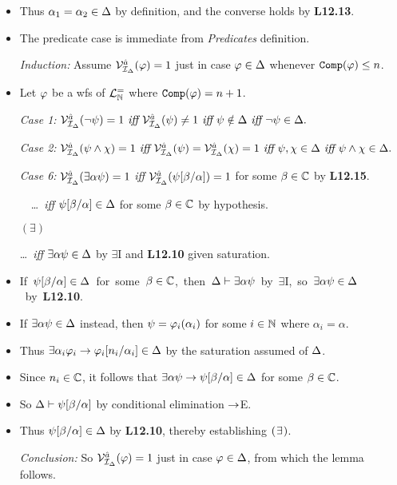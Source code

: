 \documentclass[a4paper, 11pt]{article} %
\begin{document}
\begin{itemize}
    \item Thus $\alpha_1=\alpha_2\in\Delta$ by definition, and the converse holds by \textbf{L12.13}.
    \item The predicate case is immediate from \textit{Predicates} definition.
  \item[\it Induction:] Assume $\mathcal{V}_{\mathcal{I}_{\Delta}}^{\hat{a}}(\varphi)=1$ just in case $\varphi\in\Delta$ whenever $\texttt{Comp}(\varphi)\leq n$.
    \setcounter{enumi}{0}
  \item Let $\varphi$ be a wfs of $\mathcal{L}^{=}_{\mathbb{N}}$ where $\texttt{Comp}(\varphi)=n+1$.
  \item[\it Case 1:]     
    $ \mathcal{V}_{\mathcal{I}_{\Delta}}^{\hat{a}}(\neg\psi)=1
      \textit{ iff } \mathcal{V}_{\mathcal{I}_{\Delta}}^{\hat{a}}(\psi)\neq 1
      \textit{ iff } \psi\notin\Delta
      \textit{ iff } \neg\psi\in\Delta.$
  \item[\it Case 2:]     
    $ \mathcal{V}_{\mathcal{I}_{\Delta}}^{\hat{a}}(\psi\wedge\chi)=1
      \textit{ iff } \mathcal{V}_{\mathcal{I}_{\Delta}}^{\hat{a}}(\psi)=\mathcal{V}_{\mathcal{I}_{\Delta}}^{\hat{a}}(\chi)=1 
      \textit{ iff } \psi,\chi\in\Delta 
      \textit{ iff } \psi\wedge\chi\in\Delta.$
  \item[\it Case 6:] $\mathcal{V}_{\mathcal{I}_{\Delta}}^{\hat{a}}(\exists \alpha\psi)=1$  \textit{iff} $\mathcal{V}_{\mathcal{I}_{\Delta}}^{\hat{a}}(\psi[\beta/\alpha])=1$ for some $\beta\in\mathbb{C}$ by \textbf{L12.15}.
    \setcounter{enumi}{0}
  \item[] \strut\quad\quad~~\ldots\ \textit{iff} $\psi[\beta/\alpha]\in\Delta$ for some $\beta\in\mathbb{C}$ by hypothesis.
  \item[] $(\exists)$ \strut\quad\ldots\ \textit{iff} $\exists \alpha\psi\in\Delta$ by $\exists$I and \textbf{L12.10} given saturation.  
    \item \mbox{If $\psi[\beta/\alpha]\in\Delta$ for some $\beta\in\mathbb{C}$, then $\Delta\vdash \exists \alpha\psi$ by $\exists$I, so $\exists \alpha\psi\in\Delta$ by \textbf{L12.10}.}
    \item If $\exists \alpha\psi\in\Delta$ instead, then $\psi=\varphi_i(\alpha_i)$ for some $i\in\mathbb{N}$ where $\alpha_i=\alpha$.
    \item Thus $\exists \alpha_i\varphi_i\rightarrow \varphi_i[n_i/\alpha_i]\in\Delta$ by the saturation assumed of $\Delta$.
    \item Since $n_i\in\mathbb{C}$, it follows that $\exists \alpha\psi\rightarrow\psi[\beta/\alpha]\in\Delta$ for some $\beta\in\mathbb{C}$.
    \item So $\Delta\vdash\psi[\beta/\alpha]$ by conditional elimination $\rightarrow$E. 
    \item Thus $\psi[\beta/\alpha]\in\Delta$ by \textbf{L12.10}, thereby establishing $(\hspace{.7pt}\exists\hspace{.7pt})$.
  \item[\it Conclusion:] So $\mathcal{V}_{\mathcal{I}_{\Delta}}^{\hat{a}}(\varphi)=1$ just in case $\varphi\in\Delta$, from which the lemma follows.
\end{itemize}
\end{document}

